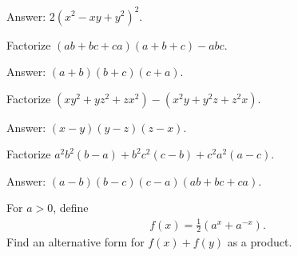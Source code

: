 \documentclass[12pt,a4paper]{memoir}
\theoremstyle{definition}
\begin{document}
\begin{solution}
	Answer: $2(x^2-xy+y^2)^2$.
\end{solution}


\setcounter{question}{75}



\begin{tcolorbox}
	\begin{question}
		Factorize $(ab+bc+ca)(a+b+c)-abc$.
	\end{question}
\end{tcolorbox}

\begin{solution}%
	Answer: $(a+b)(b+c)(c+a)$.
\end{solution}



\begin{tcolorbox}
	\begin{question}
		Factorize $(xy^2+yz^2+zx^2)-(x^2y+y^2z+z^2x)$.
	\end{question}
\end{tcolorbox}

\begin{solution}
	Answer: $(x-y)(y-z)(z-x)$.
\end{solution}


\setcounter{question}{86}

\begin{tcolorbox}
	\begin{question}
		Factorize $a^2b^2(b-a) + b^2c^2(c-b) + c^2a^2(a-c)$.
	\end{question}
\end{tcolorbox}

\begin{solution}%
	Answer: $(a-b)(b-c)(c-a)(ab+bc+ca)$.
\end{solution}

\setcounter{question}{103}



\begin{tcolorbox}
	\begin{question}
		For $a>0$, define
		\begin{align*}
			f(x)= \frac{1}{2}\left(a^{x}+a^{-x}\right).
		\end{align*}
		Find an alternative form for $f(x)+f(y)$ as a product.
	\end{question}
\end{tcolorbox}
\end{document}
